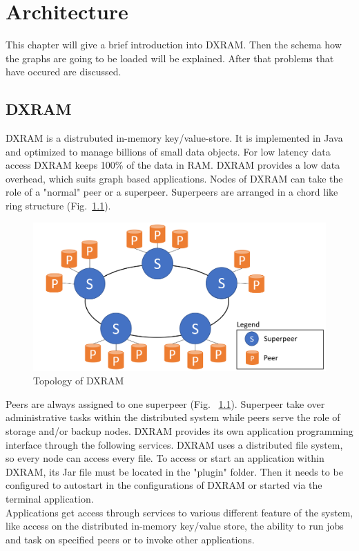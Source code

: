 \chapter{Architecture}
\label{Architecture}
This chapter will give a brief introduction into DXRAM. Then the schema how the graphs are going to be loaded will be explained. After that problems that have occured are discussed. 
\section{DXRAM}
DXRAM is a distrubuted in-memory key/value-store. 
It is implemented in Java and optimized to manage billions of small data objects. 
For low latency data access DXRAM keeps 100\% of the data in RAM.
DXRAM provides a low data overhead, which suits graph based applications.
Nodes of DXRAM can take the role of a "normal" peer or a superpeer. Superpeers are arranged in a chord like ring structure (Fig.~\ref{topology}). 
\begin{figure}[H]
	\centering
	\includegraphics[width=1.0\linewidth]{img/topology.png}
	\caption{Topology of DXRAM}
	\label{topology}
\end{figure}
Peers are always assigned to one superpeer (Fig. ~\ref{topology}). Superpeer take over administrative tasks within the distributed system while peers serve the role of storage and/or backup nodes.
DXRAM provides its own application programming interface through the following services. DXRAM uses a distributed file system, so every node can access every file. To access or start an application within DXRAM, its Jar file must be located in the "plugin" folder. Then it needs to be  configured to autostart in the configurations of DXRAM or started via the terminal application.\\
Applications get access through services to various different feature of the system, like access on the distributed in-memory key/value store, the ability to run jobs and task on specified peers or to invoke other applications.\\

